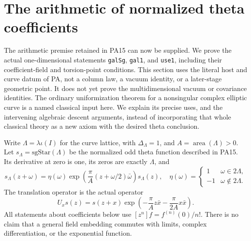 \section{The arithmetic of normalized theta coefficients}
\label{sec:theta-arithmetic}

The arithmetic premise retained in PA15 can now be supplied. We prove
the actual one-dimensional statements \texttt{galSg}, \texttt{gal1},
and \texttt{use1}, including their coefficient-field and torsion-point
conditions. This section uses the literal host and curve datum of PA,
not a column law, a vacuum identity, or a later-stage geometric point.
It does not yet prove the multidimensional vacuum or covariance
identities. The ordinary uniformization theorem for a nonsingular
complex elliptic curve is a named classical input here. We explain
its precise uses, and the intervening algebraic descent arguments,
instead of incorporating that whole classical theory as a new axiom
with the desired theta conclusion.

Write $\Lambda=\lambda\iota(I)$ for the curve lattice, with
$\Delta_\Lambda=1$, and $A=\operatorname{area}(\Lambda)>0$. Let
$s_\Lambda=\mathrm{sgStar}(\Lambda)$ be the normalized odd theta
function described in PA15. Its derivative at zero is one, its
zeros are exactly $\Lambda$, and
\[
 s_\Lambda(z+\omega)=\eta(\omega)
  \exp\!\left(\frac{\pi}{A}(z+\omega/2)\bar\omega\right)s_\Lambda(z),
 \quad
 \eta(\omega)=\begin{cases}1&\omega\in2\Lambda,\\-1&\omega\notin2\Lambda.
 \end{cases}                                                    \tag{TA.1}
\]
The translation operator is the actual operator
\[
 U_xs(z)=s(z+x)\exp\!\left(-\frac{\pi}{A}z\bar x
                           -\frac{\pi}{2A}x\bar x\right).       \tag{TA.2}
\]
All statements about coefficients below use $[z^n]f=f^{(n)}(0)/n!$.
There is no claim that a general field embedding commutes with limits,
complex differentiation, or the exponential function.

